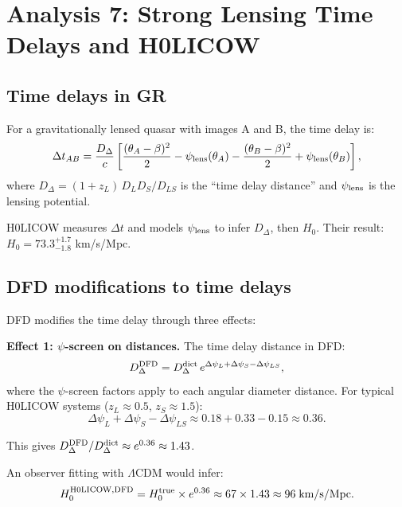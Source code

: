 \documentclass[11pt]{article}
\begin{document}
\section{Analysis 7: Strong Lensing Time Delays and H0LICOW}
\label{sec:h0licow}

\subsection{Time delays in GR}

For a gravitationally lensed quasar with images A and B, the time delay is:
\begin{equation}
\Delta t_{AB} = \frac{D_\Delta}{c}\left[\frac{(\theta_A - \beta)^2}{2} - \psi_{\rm lens}(\theta_A) - \frac{(\theta_B - \beta)^2}{2} + \psi_{\rm lens}(\theta_B)\right],
\end{equation}
where $D_\Delta = (1+z_L)\,D_L D_S / D_{LS}$ is the ``time delay distance'' and $\psi_{\rm lens}$ is the lensing potential.

H0LICOW measures $\Delta t$ and models $\psi_{\rm lens}$ to infer $D_\Delta$, then $H_0$. Their result: $H_0 = 73.3^{+1.7}_{-1.8}$ km/s/Mpc.

\subsection{DFD modifications to time delays}

DFD modifies the time delay through three effects:

\textbf{Effect 1: $\psi$-screen on distances.} The time delay distance in DFD:
\begin{equation}
D_\Delta^{\rm DFD} = D_\Delta^{\rm dict}\,e^{\Delta\psi_L + \Delta\psi_S - \Delta\psi_{LS}},
\end{equation}
where the $\psi$-screen factors apply to each angular diameter distance. For typical H0LICOW systems ($z_L \approx 0.5$, $z_S \approx 1.5$):
\begin{equation}
\Delta\psi_L + \Delta\psi_S - \Delta\psi_{LS} \approx 0.18 + 0.33 - 0.15 \approx 0.36.
\end{equation}

This gives $D_\Delta^{\rm DFD}/D_\Delta^{\rm dict} \approx e^{0.36} \approx 1.43$.

An observer fitting with $\Lambda$CDM would infer:
\begin{equation}
H_0^{\rm H0LICOW, DFD} = H_0^{\rm true} \times e^{0.36} \approx 67 \times 1.43 \approx 96\;\text{km/s/Mpc}.
\end{equation}
\end{document}
